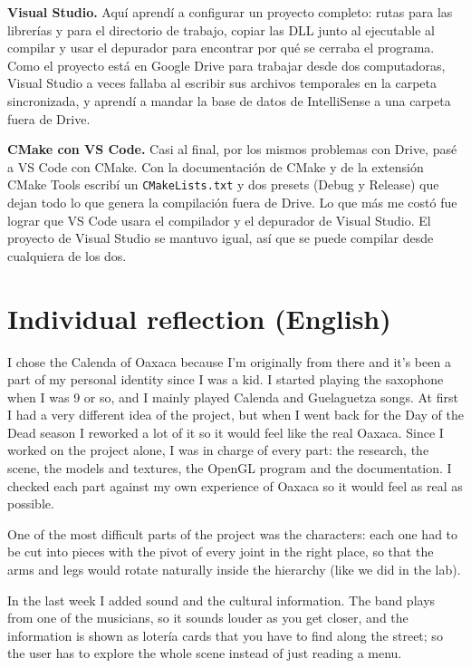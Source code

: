 \documentclass[11pt,a4paper]{article}
\begin{document}
\textbf{Visual Studio.} Aquí aprendí a configurar un proyecto completo: rutas para las librerías y para el directorio de trabajo, copiar las DLL junto al ejecutable al compilar y usar el depurador para encontrar por qué se cerraba el programa. Como el proyecto está en Google Drive para trabajar desde dos computadoras, Visual Studio a veces fallaba al escribir sus archivos temporales en la carpeta sincronizada, y aprendí a mandar la base de datos de IntelliSense a una carpeta fuera de Drive.

\textbf{CMake con VS Code.} Casi al final, por los mismos problemas con Drive, pasé a VS Code con CMake. Con la documentación de CMake y de la extensión CMake Tools escribí un \texttt{CMakeLists.txt} y dos presets (Debug y Release) que dejan todo lo que genera la compilación fuera de Drive. Lo que más me costó fue lograr que VS Code usara el compilador y el depurador de Visual Studio. El proyecto de Visual Studio se mantuvo igual, así que se puede compilar desde cualquiera de los dos.

\section{Individual reflection (English)}

I chose the Calenda of Oaxaca because I'm originally from there and it's been a part of my personal identity since I was a kid. I started playing the saxophone when I was 9 or so, and I mainly played Calenda and Guelaguetza songs. At first I had a very different idea of the project, but when I went back for the Day of the Dead season I reworked a lot of it so it would feel like the real Oaxaca. Since I worked on the project alone, I was in charge of every part: the research, the scene, the models and textures, the OpenGL program and the documentation. I checked each part against my own experience of Oaxaca so it would feel as real as possible.

One of the most difficult parts of the project was the characters: each one had to be cut into pieces with the pivot of every joint in the right place, so that the arms and legs would rotate naturally inside the hierarchy (like we did in the lab).

In the last week I added sound and the cultural information. The band plays from one of the musicians, so it sounds louder as you get closer, and the information is shown as lotería cards that you have to find along the street; so the user has to explore the whole scene instead of just reading a menu.
\end{document}
